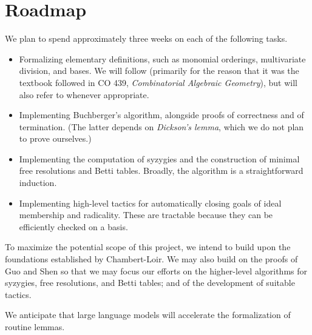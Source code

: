 \documentclass[acmsmall,nonacm,screen]{acmart}
\begin{document}
\section{Roadmap}

We plan to spend approximately three weeks on each of the following tasks.

\begin{itemize}
\item
Formalizing elementary definitions, such as monomial orderings, multivariate division, and \Groebner{} bases.
We will follow \cite{EneHerzog} (primarily for the reason that it was the textbook followed in CO 439, {\it Combinatorial Algebraic Geometry}), but will also refer to \cite{CoxLittleOShea} whenever appropriate.
\item 
Implementing Buchberger's algorithm, alongside proofs of correctness and of termination.
(The latter depends on {\it Dickson's lemma}, which we do not plan to prove ourselves.)
\item 
Implementing the computation of syzygies and the construction of minimal free resolutions and Betti tables.
Broadly, the algorithm is a straightforward induction.
\item 
Implementing high-level tactics for automatically closing goals of ideal membership and radicality.
These are tractable because they can be efficiently checked on a \Groebner{} basis.
\end{itemize}

To maximize the potential scope of this project, we intend to build upon the foundations established by Chambert-Loir.
We may also build on the proofs of Guo and Shen \cite{GroebnerLean} so that we may focus our efforts on the higher-level algorithms for syzygies, free resolutions, and Betti tables; and of the development of suitable tactics.

We anticipate that large language models will accelerate the formalization of routine lemmas. 



\end{document}

